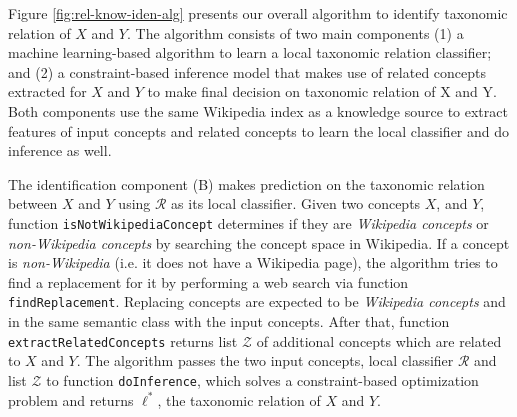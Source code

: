 Figure \ref{fig:rel-know-iden-alg} presents our overall algorithm to
identify taxonomic relation of $X$ and $Y$. The algorithm consists of
two main components (1) a machine learning-based algorithm to learn a
local taxonomic relation classifier; and (2) a constraint-based
inference model that makes use of related concepts extracted for $X$
and $Y$ to make final decision on taxonomic relation of X and Y.  Both
components use the same Wikipedia index as a knowledge source to
extract features of input concepts and related concepts to learn the
local classifier and do inference as well.

The identification component (B) makes prediction on the taxonomic
relation between $X$ and $Y$ using $\mathcal{R}$ as its local
classifier.  Given two concepts $X$, and $Y$, function
\texttt{isNotWikipediaConcept} determines if they are {\em Wikipedia
  concepts} or {\em non-Wikipedia concepts} by searching the concept
space in Wikipedia. If a concept is {\em non-Wikipedia} (i.e. it does
not have a Wikipedia page), the algorithm tries to find a replacement
for it by performing a web search via function
\texttt{findReplacement}. Replacing concepts are expected to be {\em
  Wikipedia concepts} and in the same semantic class with the input
concepts. After that, function \texttt{extractRelatedConcepts} returns
list $\mathcal{Z}$ of additional concepts which are related to $X$ and
$Y$. The algorithm passes the two input concepts, local classifier
$\mathcal{R}$ and list $\mathcal{Z}$ to function \texttt{doInference},
which solves a constraint-based optimization problem and returns
$\ell^*$, the taxonomic relation of $X$ and $Y$.


